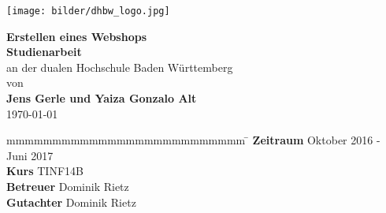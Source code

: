 \begin{titlepage}
	\centering
	\texttt{[image: bilder/dhbw\_logo.jpg]}
	\enlargethispage{20mm}
	\begin{center}
		\vspace*{12mm}	{\LARGE\textbf{Erstellen eines Webshops} }\\
		\vspace*{12mm}	{\large\textbf{Studienarbeit}}\\
		\vspace*{3mm}	an der dualen Hochschule Baden Württemberg\\
		\vspace*{3mm}	von\\
		\vspace*{3mm}	{\large\textbf{Jens Gerle und Yaiza Gonzalo Alt}}\\
		\vspace*{12mm}	\today\\
	\end{center}
	\vspace*{75mm}
	\begin{spacing}{1.2}
		\begin{tabbing}
			mmmmmmmmmmmmmmmmmmmmmmmmmm             \= \kill
			\textbf{Zeitraum}       \>  Oktober 2016 - Juni 2017\\
			\textbf{Kurs}  			\>   TINF14B\\
			\textbf{Betreuer}       \>  Dominik Rietz\\
			\textbf{Gutachter}      \>  Dominik Rietz
		\end{tabbing}
	\end{spacing}
\end{titlepage}